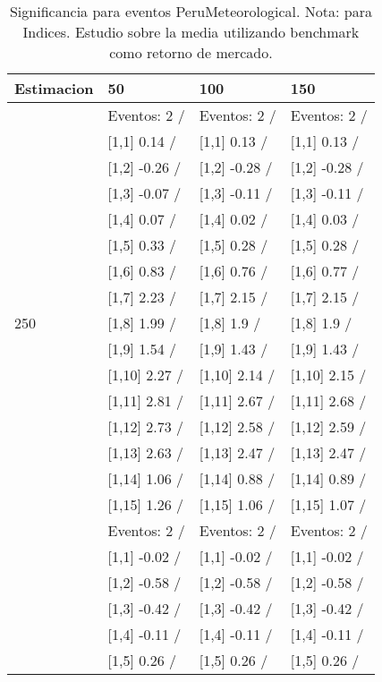 \begin{table}

\caption{Significancia para eventos PeruMeteorological. Nota: para Indices. Estudio sobre la media utilizando benchmark como retorno de mercado.}
\centering
\begin{tabular}[t]{llll}
\toprule
Estimacion & 50 & 100 & 150\\
\midrule
 & Eventos:  2 / & Eventos:  2 / & Eventos:  2 /\\
 & {}[1,1] 0.14  / & {}[1,1] 0.13  / & {}[1,1] 0.13  /\\
 & {}[1,2] -0.26  / & {}[1,2] -0.28  / & {}[1,2] -0.28  /\\
 & {}[1,3] -0.07  / & {}[1,3] -0.11  / & {}[1,3] -0.11  /\\
 & {}[1,4] 0.07  / & {}[1,4] 0.02  / & {}[1,4] 0.03  /\\
\addlinespace
 & {}[1,5] 0.33  / & {}[1,5] 0.28  / & {}[1,5] 0.28  /\\
 & {}[1,6] 0.83  / & {}[1,6] 0.76  / & {}[1,6] 0.77  /\\
 & {}[1,7] 2.23  / & {}[1,7] 2.15  / & {}[1,7] 2.15  /\\
250 & {}[1,8] 1.99  / & {}[1,8] 1.9  / & {}[1,8] 1.9  /\\
 & {}[1,9] 1.54  / & {}[1,9] 1.43  / & {}[1,9] 1.43  /\\
\addlinespace
 & {}[1,10] 2.27  / & {}[1,10] 2.14  / & {}[1,10] 2.15  /\\
 & {}[1,11] 2.81  / & {}[1,11] 2.67  / & {}[1,11] 2.68  /\\
 & {}[1,12] 2.73  / & {}[1,12] 2.58  / & {}[1,12] 2.59  /\\
 & {}[1,13] 2.63  / & {}[1,13] 2.47  / & {}[1,13] 2.47  /\\
 & {}[1,14] 1.06  / & {}[1,14] 0.88  / & {}[1,14] 0.89  /\\
\addlinespace
 & {}[1,15] 1.26  / & {}[1,15] 1.06  / & {}[1,15] 1.07  /\\
 & Eventos:  2 / & Eventos:  2 / & Eventos:  2 /\\
 & {}[1,1] -0.02  / & {}[1,1] -0.02  / & {}[1,1] -0.02  /\\
 & {}[1,2] -0.58  / & {}[1,2] -0.58  / & {}[1,2] -0.58  /\\
 & {}[1,3] -0.42  / & {}[1,3] -0.42  / & {}[1,3] -0.42  /\\
\addlinespace
 & {}[1,4] -0.11  / & {}[1,4] -0.11  / & {}[1,4] -0.11  /\\
 & {}[1,5] 0.26  / & {}[1,5] 0.26  / & {}[1,5] 0.26  /\\

\end{tabular}
\end{table}
